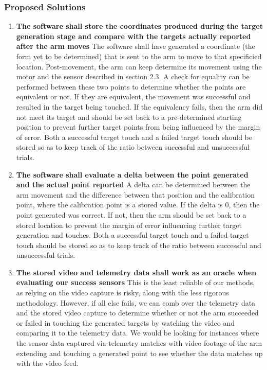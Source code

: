 \documentclass[letterpaper,10pt]{article}
\begin{document}
\subsubsection{Proposed Solutions}
\begin{enumerate}
\item{
	\textbf{The software shall store the coordinates produced during the target generation stage and compare with the targets actually
	reported after the arm moves}
The software shall have generated a coordinate (the form yet to be determined) that is sent to the arm to move to that specificied 
location. Post-movement, the arm can keep determine its movement using the motor and the sensor described in section 2.3. A check for
equality can be performed between these two points to determine whether the points are equivalent or not. If they are equivalent, the
movement was successful and resulted in the target being touched. If the equivalency fails, then the arm did not meet its target
and should be set back to a pre-determined starting position to prevent further target points from being influenced by the margin
of error. Both a successful target touch and a failed target touch should be stored so as to keep track of the ratio between successful
and unsuccessful trials.
}
\item{
	\textbf{The software shall evaluate a delta between the point generated and the actual point reported}
A delta can be determined between the arm movement and the difference between that position and the calibration point, where the 
calibration point is a stored value. If the delta is 0, then the point generated was correct. If not, then the arm should be set 
back to a stored location to prevent the margin of error influencing further target generation and touches. Both a successful 
target touch and a failed target touch should be stored so as to keep track of the ratio between successful
and unsuccessful trials.
}
\item{
	\textbf{The stored video and telemetry data shall work as an oracle when evaluating our success sensors}
	This is the least reliable of our methods, as relying on the video capture is risky, along with the less rigorous methodology.
	However, if all else fails, we can comb over the telemetry data and the stored video capture to determine whether or not the arm
	succeeded or failed in touching the generated targets by watching the video and comparing it to the telemetry data. We would be 
	looking for instances where the sensor data captured via telemetry matches with video footage of the arm extending and touching
	a generated point to see whether the data matches up with the video feed.
}
\end{enumerate}
\end{document}
